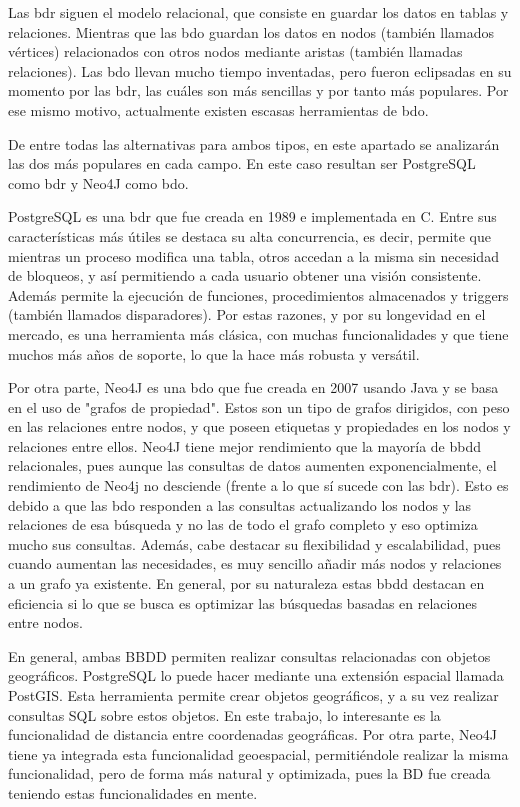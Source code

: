     Las \ac{bdr} siguen el modelo relacional, que consiste en guardar los datos en tablas y relaciones. Mientras que las \ac{bdo} guardan los datos en nodos (también llamados vértices) relacionados con otros nodos mediante aristas (también llamadas relaciones). Las \ac{bdo} llevan mucho tiempo inventadas, pero fueron eclipsadas en su momento por las \ac{bdr}, las cuáles son más sencillas y por tanto más populares. Por ese mismo motivo, actualmente existen escasas herramientas de \ac{bdo}.
    
    De entre todas las alternativas para ambos tipos, en este apartado se analizarán las dos más populares en cada campo. En este caso resultan ser PostgreSQL\cite{postgres} como \ac{bdr} y Neo4J\cite{neo4j} como \ac{bdo}.
    
    PostgreSQL es una \ac{bdr} que fue creada en 1989 e implementada en C. Entre sus características más útiles se destaca su alta concurrencia, es decir, permite que mientras un proceso modifica una tabla, otros accedan a la misma sin necesidad de bloqueos, y así permitiendo a cada usuario obtener una visión consistente. Además permite la ejecución de funciones, procedimientos almacenados y triggers (también llamados disparadores).
    Por estas razones, y por su longevidad en el mercado, es una herramienta más clásica, con muchas funcionalidades y que tiene muchos más años de soporte, lo que la hace más robusta y versátil.
    
    Por otra parte, Neo4J es una \ac{bdo} que fue creada en 2007 usando Java y se basa en el uso de "grafos de propiedad". Estos son un tipo de grafos dirigidos, con peso en las relaciones entre nodos, y que poseen etiquetas y propiedades en los nodos y relaciones entre ellos. Neo4J tiene mejor rendimiento que la mayoría de \ac{bbdd} relacionales, pues aunque las consultas de datos aumenten exponencialmente, el rendimiento de Neo4j no desciende (frente a lo que sí sucede con las \ac{bdr}). Esto es debido a que las \ac{bdo} responden a las consultas actualizando los nodos y las relaciones de esa búsqueda y no las de todo el grafo completo y eso optimiza mucho sus consultas.
    Además, cabe destacar su flexibilidad y escalabilidad, pues cuando aumentan las necesidades, es muy sencillo añadir más nodos y relaciones a un grafo ya existente.
    En general, por su naturaleza estas \ac{bbdd} destacan en eficiencia si lo que se busca es optimizar las búsquedas basadas en relaciones entre nodos. 
    
    En general, ambas BBDD permiten realizar consultas relacionadas con objetos geográficos.
    PostgreSQL lo puede hacer mediante una extensión espacial llamada PostGIS\cite{postgis}. Esta herramienta permite crear objetos geográficos, y a su vez realizar consultas SQL sobre estos objetos. En este trabajo, lo interesante es la funcionalidad de distancia entre coordenadas geográficas.
    Por otra parte, Neo4J tiene ya integrada esta funcionalidad geoespacial, permitiéndole realizar la misma funcionalidad, pero de forma más natural y optimizada, pues la BD fue creada teniendo estas funcionalidades en mente.
    
